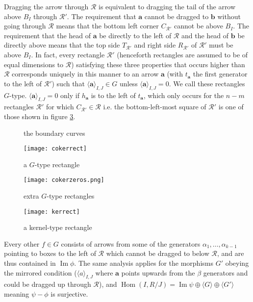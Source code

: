 \documentclass[a4page]{article}
\def\Hom{\operatorname{Hom}}
\theoremstyle{definition}
\newcommand{\R}{\mathcal{R}}
\DeclareMathOperator{\im}{Im}
\begin{document}
Dragging the arrow through $\R$ is equivalent to dragging the tail of the arrow above $B_I$ through $\R'$.
The requirement that $\mathbf a$ cannot be dragged to $\mathbf b$ without going through $\R$ means that the bottom left corner $C_{\R'}$ cannot be above $B_I$.
The requirement that the head of $\mathbf a$ be directly to the left of $\R$ and the head of $\mathbf b$ be directly above means that the top side $T_{\R'}$ and right side $R_{\R'}$ of $\R'$ must be above $B_I$.
In fact, every rectangle $\R'$ (henceforth rectangles are assumed to be of equal dimensions to $\R$) satisfying these three properties that occurs higher than $\R$
corresponds uniquely in this manner to an arrow $\mathbf a$ (with $t_{\mathbf a}$ the first generator to the left of $\R'$) such that
$\langle\mathbf a\rangle_{I,J} \in G$ unless $\langle\mathbf a\rangle_{I,J}=0$. We call these rectangles $G$-type.
$\langle\mathbf a\rangle_{I,J}=0$ only if $h_{\mathbf a}$ is to the left of $t_{\mathbf a}$, which only occurs for the $n-m$ rectangles $\R'$ for which $C_{\R'} \in \R$
i.e. the bottom-left-most square of $\R'$ is one of those shown in figure \ref{fig:poss}.

\begin{figure}%
    \centering
    \subfloat[$B_I$]{{\texttt{[image: S\_I]} }}%
    \qquad
    \subfloat[$B_J$]{{\texttt{[image: S\_J]} }}%
    \caption{the boundary curves}%
    \label{fig:bounds}%
\end{figure}

\begin{figure}
\centering
\texttt{[image: cokerrect]}
\caption{a $G$-type rectangle}
\label{fig:cokrects}
\end{figure}

\begin{figure}
\centering
\texttt{[image: cokerzeros.png]}
\caption{extra $G$-type rectangles}
\label{fig:poss}
\end{figure}

\begin{figure}
\centering
\texttt{[image: kerrect]}
\caption{a kernel-type rectangle}
\label{fig:kerrects}
\end{figure}

Every other $f \in G$ consists of arrows from some of the generators $\alpha_1, \dots, \alpha_{k-1}$ pointing to boxes to the left of $\R$ which cannot be dragged to below $\R$,
and are thus contained in $\im \phi$.
The same analysis applies for the morphisms $G'$ obeying the mirrored condition ($\langle a \rangle_{I,J}$ where $\mathbf a$ points upwards from the $\beta$ generators and could be dragged up through $\R$),
and $\Hom(I,R/J) = \im \psi \oplus \langle G\rangle \oplus \langle G'\rangle$ meaning $\psi - \phi$ is surjective.
\end{document}
